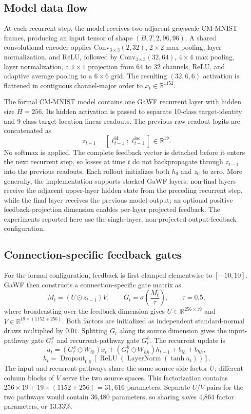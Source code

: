 \subsection{Model data flow}

At each recurrent step, the model receives two adjacent grayscale CM-MNIST frames, producing an input tensor of shape \((B,T,2,96,96)\). A shared convolutional encoder applies \(\mathrm{Conv}_{3\times3}(2,32)\), \(2\times2\) max pooling, layer normalization, and ReLU, followed by \(\mathrm{Conv}_{3\times3}(32,64)\), \(4\times4\) max pooling, layer normalization, a \(1\times1\) projection from 64 to 32 channels, ReLU, and adaptive average pooling to a \(6\times6\) grid. The resulting \((32,6,6)\) activation is flattened in contiguous channel-major order to \(x_t\in\mathbb{R}^{1152}\).

The formal CM-MNIST model contains one GaWF recurrent layer with hidden size \(H=256\). Its hidden activation is passed to separate 10-class target-identity and 9-class target-location linear readouts. The previous raw readout logits are concatenated as
\[
z_{t-1}=[\ell^{\mathrm{id}}_{t-1};\ell^{\mathrm{loc}}_{t-1}]\in\mathbb{R}^{19}.
\]
No softmax is applied. The complete feedback vector is detached before it enters the next recurrent step, so losses at time \(t\) do not backpropagate through \(z_{t-1}\) into the previous readouts. Each rollout initializes both \(h_0\) and \(z_0\) to zero. More generally, the implementation supports stacked GaWF layers: non-final layers receive the adjacent upper-layer hidden state from the preceding recurrent step, while the final layer receives the previous model output; an optional positive feedback-projection dimension enables per-layer projected feedback. The experiments reported here use the single-layer, non-projected output-feedback configuration.

\subsection{Connection-specific feedback gates}

For the formal configuration, feedback is first clamped elementwise to \([-10,10]\). GaWF then constructs a connection-specific gate matrix as
\[
M_t=(U\odot z_{t-1})V,
\qquad
G_t=\sigma\!\left(\frac{M_t}{\tau}\right),
\qquad \tau=0.5,
\]
where broadcasting over the feedback dimension gives \(U\in\mathbb{R}^{256\times19}\) and \(V\in\mathbb{R}^{19\times(1152+256)}\). Both factors are initialized as independent standard-normal draws multiplied by \(0.01\). Splitting \(G_t\) along its source dimension gives the input-pathway gate \(G_t^x\) and recurrent-pathway gate \(G_t^h\). The recurrent update is
\[
a_t=(G_t^x\odot W_{ih})x_t+(G_t^h\odot W_{hh})h_{t-1}+b_{ih}+b_{hh},
\]
\[
h_t=\operatorname{Dropout}_{0.5}\!\left[\operatorname{ReLU}\!\left(\operatorname{LayerNorm}\!\left(\tanh a_t\right)\right)\right].
\]
The input and recurrent pathways share the same source-side factor \(U\); different column blocks of \(V\) serve the two source spaces. This factorization contains \(256\times19+19\times(1152+256)=31{,}616\) parameters. Separate \(U/V\) pairs for the two pathways would contain 36,480 parameters, so sharing saves 4,864 factor parameters, or \(13.33\%\).

